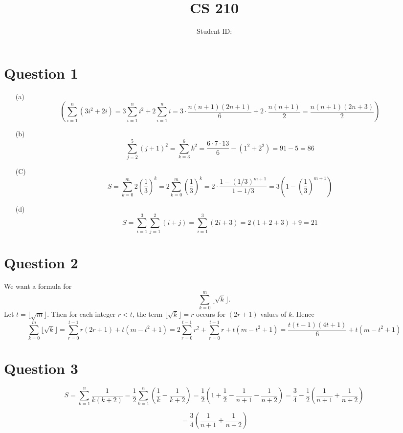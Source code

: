 \documentclass[twoside]{article}
\title{CS 210 \hwNo}
\author{\myname \qquad Student ID:\myid}
\date{\currentdate}
\begin{document}
\maketitle

\section*{Question 1}

\begin{enumerate}
    \item[(a)]  \[(\sum_{i=1}^n (3i^2 + 2i) = 3\sum_{i=1}^n i^2 + 2\sum_{i=1}^n i = 3\cdot\frac{n(n+1)(2n+1)}{6} + 2\cdot\frac{n(n+1)}{2} = \frac{n(n+1)(2n+3)}{2}) \]
    \item[(b)]  \[\sum_{j=2}^{5} (j+1)^2 = \sum_{k=3}^{6} k^2 = \frac{6\cdot7\cdot13}{6} - (1^2 + 2^2) = 91 - 5 = 86\]
    \item[(C)]  \[S = \sum_{k=0}^m 2\left(\frac{1}{3}\right)^k = 2\sum_{k=0}^m \left(\frac{1}{3}\right)^k = 2\cdot\frac{1-(1/3)^{m+1}}{1-1/3} = 3\left(1 - \left(\frac{1}{3}\right)^{m+1}\right)\]
    \item[(d)]  \[S = \sum_{i=1}^3 \sum_{j=1}^2 (i+j)= \sum_{i=1}^3 (2i+3) = 2(1+2+3) + 9 = 21\] 

\end{enumerate}

\section*{Question 2}
We want a formula for \[\sum_{k=0}^m \lfloor \sqrt{k} \rfloor.\]
Let \(t = \lfloor \sqrt{m} \rfloor\). Then for each integer \(r < t\), the term \(\lfloor \sqrt{k}\rfloor = r\) occurs for \((2r+1)\) values of \(k\). Hence 
\[\sum_{k=0}^m \lfloor \sqrt{k} \rfloor= \sum_{r=0}^{t-1} r(2r+1) + t(m - t^2 + 1) = 2\sum_{r=0}^{t-1} r^2 + \sum_{r=0}^{t-1} r + t(m - t^2 + 1) = \frac{t(t-1)(4t+1)}{6} + t(m - t^2 + 1)\]

\newpage

\section*{Question 3}
\[S = \sum_{k=1}^n \frac{1}{k(k+2)} = \frac{1}{2}\sum_{k=1}^n \left(\frac{1}{k} - \frac{1}{k+2}\right)
= \frac{1}{2}\left(1 + \frac{1}{2} - \frac{1}{n+1} - \frac{1}{n+2}\right)
= \frac{3}{4} - \frac{1}{2}\left(\frac{1}{n+1} + \frac{1}{n+2}\right)\]

\[= \frac{3}{4} \left(\frac{1}{n+1} + \frac{1}{n+2}\right)\]
\end{document}

